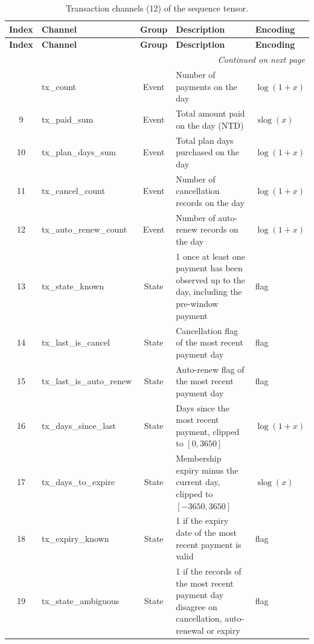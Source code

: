 \documentclass{article}
\newcommand{\slog}{\operatorname{slog}}
\begin{document}
\renewcommand{\arraystretch}{1.3}
\begin{longtable}{|c|l|c|p{6.2cm}|l|}
\hline
\textbf{Index} & \textbf{Channel} & \textbf{Group} & \textbf{Description} & \textbf{Encoding} \\ \hline
\endfirsthead
\hline
\textbf{Index} & \textbf{Channel} & \textbf{Group} & \textbf{Description} & \textbf{Encoding} \\ \hline
\endhead
\hline
\multicolumn{5}{r}{\small\textit{Continued on next page}} \\
\endfoot
\hline
\caption{Transaction channels (12) of the sequence tensor.}
\label{tab:w2_transactions}
\endlastfoot
8  & tx\_count               & Event & Number of payments on the day & $\log(1+x)$ \\ \hline
9  & tx\_paid\_sum           & Event & Total amount paid on the day (NTD) & $\slog(x)$ \\ \hline
10 & tx\_plan\_days\_sum     & Event & Total plan days purchased on the day & $\log(1+x)$ \\ \hline
11 & tx\_cancel\_count       & Event & Number of cancellation records on the day & $\log(1+x)$ \\ \hline
12 & tx\_auto\_renew\_count  & Event & Number of auto-renew records on the day & $\log(1+x)$ \\ \hline
13 & tx\_state\_known        & State & 1 once at least one payment has been observed up to the day, including the pre-window payment & flag \\ \hline
14 & tx\_last\_is\_cancel    & State & Cancellation flag of the most recent payment day & flag \\ \hline
15 & tx\_last\_is\_auto\_renew & State & Auto-renew flag of the most recent payment day & flag \\ \hline
16 & tx\_days\_since\_last   & State & Days since the most recent payment, clipped to $[0, 3650]$ & $\log(1+x)$ \\ \hline
17 & tx\_days\_to\_expire    & State & Membership expiry minus the current day, clipped to $[-3650, 3650]$ & $\slog(x)$ \\ \hline
18 & tx\_expiry\_known       & State & 1 if the expiry date of the most recent payment is valid & flag \\ \hline
19 & tx\_state\_ambiguous    & State & 1 if the records of the most recent payment day disagree on cancellation, auto-renewal or expiry & flag \\ \hline
\end{longtable}
\end{document}
